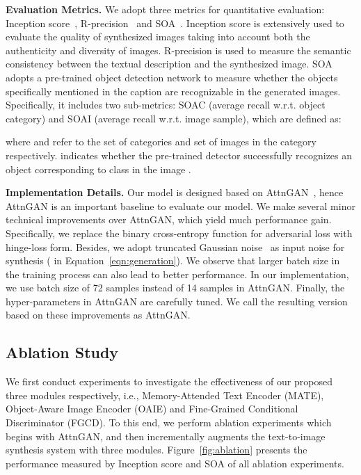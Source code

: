 \documentclass[runningheads]{llncs}
\begin{document}
\smallskip\noindent\textbf{Evaluation Metrics.} We adopt three metrics for quantitative evaluation: Inception score~\cite{salimans2016improved}, R-precision~\cite{xu2018attngan} and SOA~\cite{hinz2019semantic}.
Inception score is extensively used to evaluate the quality of synthesized images taking into account both the authenticity and diversity of images. R-precision is used to measure the semantic consistency between the textual description and the synthesized image.
SOA adopts a pre-trained object detection network to measure whether the objects specifically mentioned in the caption are recognizable in the generated images.
Specifically, it includes two sub-metrics:  SOA\text{-}C (average recall w.r.t. object category) and SOA\text{-}I (average recall w.r.t. image sample), which are defined as:
\begin{small}

\end{small}

\noindent 
where  and  refer to the set of categories and set of images in the category  respectively.
 indicates whether the pre-trained detector successfully recognizes an object corresponding to class  in the image .



 \smallskip\noindent\textbf{Implementation Details.} Our model is designed based on AttnGAN~\cite{xu2018attngan}, hence AttnGAN is an important baseline to evaluate our model. We make several minor technical improvements over AttnGAN, which yield much performance gain. Specifically, we replace the binary cross-entropy function for adversarial loss with hinge-loss form. Besides, we adopt truncated Gaussian noise~\cite{Brock2018Large} as input noise for synthesis ( in Equation~\ref{eqn:generation}). We observe that larger batch size in the training process can also lead to better performance. In our implementation, we use batch size of 72 samples instead of 14 samples in AttnGAN. Finally, the hyper-parameters in AttnGAN are carefully tuned. We call the resulting version based on these improvements as AttnGAN.

\subsection{Ablation Study}
 We first conduct experiments to investigate the effectiveness of our proposed three modules respectively, i.e., Memory-Attended Text Encoder (MATE), Object-Aware Image Encoder (OAIE) and Fine-Grained Conditional Discriminator (FGCD). To this end, we perform ablation experiments which begins with AttnGAN, and then incrementally augments the text-to-image synthesis system with three modules. Figure~\ref{fig:ablation} presents the performance measured by Inception score and SOA of all ablation experiments.
 
\end{document}
